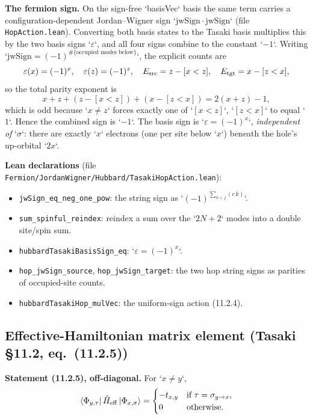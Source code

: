 \documentclass[a4paper,11pt]{article}
\begin{document}
\medskip
\noindent\textbf{The fermion sign.}
On the sign-free `basisVec` basis the same term carries a configuration-dependent
Jordan--Wigner sign `\(\mathrm{jwSign}\cdot\mathrm{jwSign}\)`
(file \texttt{HopAction.lean}). Converting both basis states to the Tasaki basis
multiplies this by the two basis signs `\(\varepsilon\)`, and all four signs
combine to the constant `\(-1\)`. Writing
`\(\mathrm{jwSign} = (-1)^{\#\{\text{occupied modes below}\}}\)`, the explicit
counts are
\[
  \varepsilon(x) = (-1)^x,\quad \varepsilon(z) = (-1)^z,\quad
  E_{\rm src} = z - [x<z],\quad E_{\rm tgt} = x - [z<x],
\]
so the total parity exponent is
\[
  x + z + (z - [x<z]) + (x - [z<x]) = 2(x+z) - 1,
\]
which is odd because `\(x \neq z\)` forces exactly one of `\([x<z]\)`,
`\([z<x]\)` to equal `\(1\)`. Hence the combined sign is `\(-1\)`. The basis
sign is `\(\varepsilon = (-1)^x\)`, \emph{independent of} `\(\sigma\)`: there are
exactly `\(x\)` electrons (one per site below `\(x\)`) beneath the hole's
up-orbital `\(2x\)`.

\medskip
\noindent\textbf{Lean declarations}
(file \texttt{Fermion/JordanWigner/Hubbard/TasakiHopAction.lean}):
\begin{itemize}
  \item \texttt{jwSign\_eq\_neg\_one\_pow}: the string sign as
    `\((-1)^{\sum_{k<j}(c\,k)}\)`.
  \item \texttt{sum\_spinful\_reindex}: reindex a sum over the `\(2N+2\)` modes
    into a double site/spin sum.
  \item \texttt{hubbardTasakiBasisSign\_eq}: `\(\varepsilon = (-1)^x\)`.
  \item \texttt{hop\_jwSign\_source}, \texttt{hop\_jwSign\_target}: the two hop
    string signs as parities of occupied-site counts.
  \item \texttt{hubbardTasakiHop\_mulVec}: the uniform-sign action (11.2.4).
\end{itemize}

\subsection{Effective-Hamiltonian matrix element (Tasaki §11.2, eq.~(11.2.5))}
\label{subsec:hubbard-matrix-element}

\noindent\textbf{Statement (11.2.5), off-diagonal.}
For `\(x \neq y\)`,
\[
  \langle \Phi_{y,\tau} |\, \hat H_{\rm eff}\, | \Phi_{x,\sigma} \rangle
    = \begin{cases} -t_{x,y} & \text{if } \tau = \sigma_{y\to x},\\ 0 & \text{otherwise.}\end{cases}
\]
\end{document}
